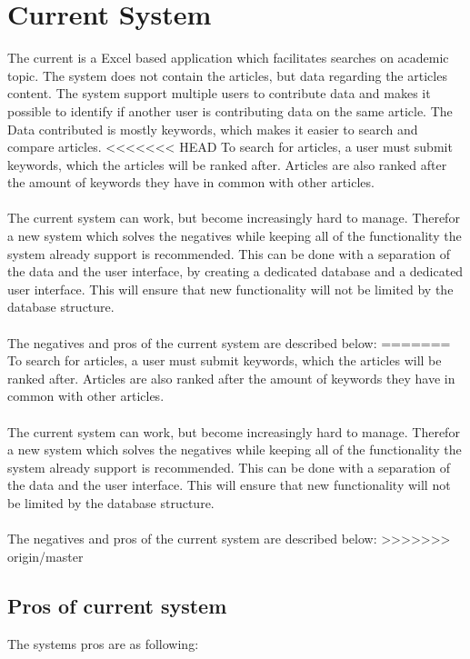 \section{Current System}

The current is a Excel based application which facilitates searches on academic topic. The system does not contain the articles, but data regarding the articles content. 
The system support multiple users to contribute data and makes it possible to identify if another user is contributing data on the same article. The Data contributed is mostly keywords, which makes it easier to search and compare articles. 
<<<<<<< HEAD
To search for articles, a user must submit keywords, which the articles will be ranked after. Articles are also ranked after the amount of keywords they have in common with other articles.\\\\
The current system can work, but become increasingly hard to manage. Therefor a new system which solves the negatives while keeping all of the functionality the system already support is recommended. This can be done with a separation of the data and the user interface, by creating a dedicated database and a dedicated user interface. This will ensure that new functionality will not be limited by the database structure.\\\\The negatives and pros of the current system are described below:
=======
To search for articles, a user must submit keywords, which the articles will be ranked after. Articles are also ranked after the amount of keywords they have in common with other articles. 
\\\\
The current system can work, but become increasingly hard to manage. Therefor a new system which solves the negatives while keeping all of the functionality the system already support is recommended. This can be done with a separation of the data and the user interface. This will ensure that new functionality will not be limited by the database structure. 
\\\\
The negatives and pros of the current system are described below:
>>>>>>> origin/master

\subsection{Pros of current system}
The systems pros are as following:

